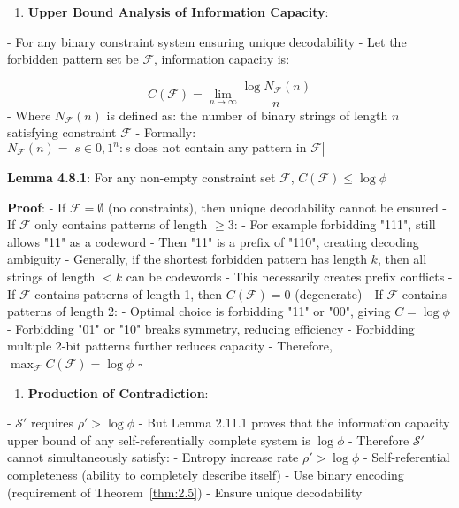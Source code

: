 \begin{enumerate}
\item \textbf{Upper Bound Analysis of Information Capacity}:
\end{enumerate}
   - For any binary constraint system ensuring unique decodability
   - Let the forbidden pattern set be $\mathcal{F}$, information capacity is:
     
\begin{equation}
C(\mathcal{F}) = \lim_{n \to \infty} \frac{\log N_{\mathcal{F}}(n)}{n}
\end{equation}
   - Where $N_{\mathcal{F}}(n)$ is defined as: the number of binary strings of length $n$ satisfying constraint $\mathcal{F}$
   - Formally: $N_{\mathcal{F}}(n) = |{s \in {0,1}^n : s\text{ does not contain any pattern in }\mathcal{F}}|$
   
   \textbf{Lemma 4.8.1}: For any non-empty constraint set $\mathcal{F}$, $C(\mathcal{F}) \leq \log \phi$
\label{lemma:2.11.1}
   
   \textbf{Proof}:
   - If $\mathcal{F} = \emptyset$ (no constraints), then unique decodability cannot be ensured
   - If $\mathcal{F}$ only contains patterns of length $\geq 3$:
     - For example forbidding "111", still allows "11" as a codeword
     - Then "11" is a prefix of "110", creating decoding ambiguity
     - Generally, if the shortest forbidden pattern has length $k$, then all strings of length $<k$ can be codewords
     - This necessarily creates prefix conflicts
   - If $\mathcal{F}$ contains patterns of length 1, then $C(\mathcal{F}) = 0$ (degenerate)
   - If $\mathcal{F}$ contains patterns of length 2:
     - Optimal choice is forbidding "11" or "00", giving $C = \log \phi$
     - Forbidding "01" or "10" breaks symmetry, reducing efficiency
     - Forbidding multiple 2-bit patterns further reduces capacity
   - Therefore, $\max_{\mathcal{F}} C(\mathcal{F}) = \log \phi$ $\square$

\begin{enumerate}
\item \textbf{Production of Contradiction}:
\end{enumerate}
   - $\mathcal{S}'$ requires $\rho' > \log \phi$
   - But Lemma 2.11.1 proves that the information capacity upper bound of any self-referentially complete system is $\log \phi$
   - Therefore $\mathcal{S}'$ cannot simultaneously satisfy:
     - Entropy increase rate $\rho' > \log \phi$
     - Self-referential completeness (ability to completely describe itself)
     - Use binary encoding (requirement of Theorem~\ref{thm:2.5})
     - Ensure unique decodability

